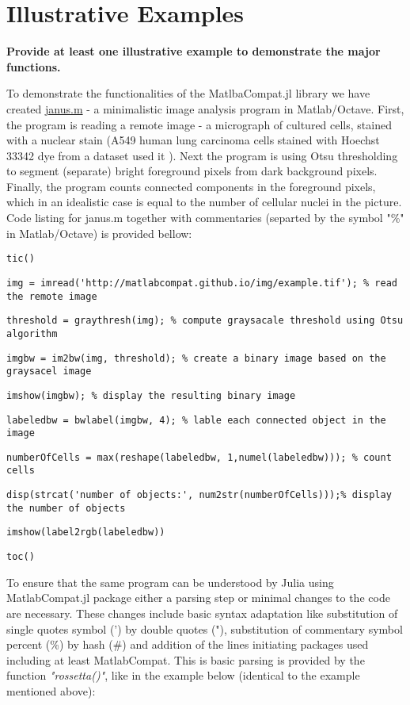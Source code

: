 \section{Illustrative Examples}
\label{} 

\textbf{Provide at least one illustrative example to demonstrate the major functions.}

To demonstrate the functionalities of the MatlbaCompat.jl library we have created \href{https://github.com/MatlabCompat/MatlabCompat.jl/blob/dev/test/janus.m}{janus.m} - a minimalistic image analysis program in Matlab/Octave. First, the program is reading a remote image - a micrograph of cultured cells, stained with a nuclear stain (A549 human lung carcinoma cells stained with Hoechst 33342 dye from a dataset used it \cite{22787215}). Next the program is using Otsu \cite{otsu1975threshold} thresholding to segment (separate) bright foreground pixels from dark background pixels. Finally, the program counts connected components in the foreground pixels, which in an idealistic case is equal to the number of cellular nuclei in the picture. Code listing for janus.m together with commentaries (separted by the symbol "\%" in Matlab/Octave) is provided bellow:

\verb|tic()|

\verb|img = imread('http://matlabcompat.github.io/img/example.tif'); % read the remote image|

\verb|threshold = graythresh(img); % compute graysacale threshold using Otsu algorithm|

\verb|imgbw = im2bw(img, threshold); % create a binary image based on the graysacel image|

\verb|imshow(imgbw); % display the resulting binary image|

\verb|labeledbw = bwlabel(imgbw, 4); % lable each connected object in the image|

\verb|numberOfCells = max(reshape(labeledbw, 1,numel(labeledbw))); % count cells|

\verb|disp(strcat('number of objects:', num2str(numberOfCells)));% display the number of objects|

\verb|imshow(label2rgb(labeledbw))|

\verb|toc()|

To ensure that the same program can be understood by Julia using MatlabCompat.jl package either a parsing step or minimal changes to the code are necessary. These changes include basic syntax adaptation like substitution of single quotes symbol (') by double quotes ("), substitution of commentary symbol percent (\%) by hash (#) and addition of the lines initiating packages used including at least MatlabCompat. This is basic parsing is provided by the function \textit{"rossetta()"}, like in the example below (identical to the example mentioned above):


